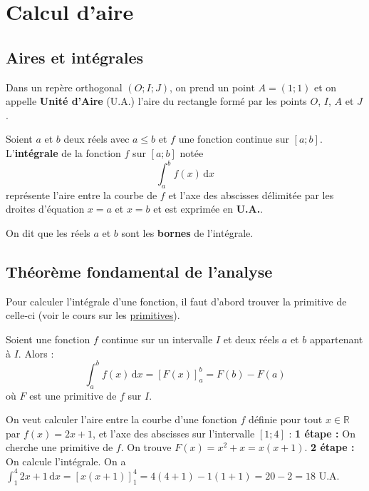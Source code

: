 


	
	\section{Calcul d'aire}
	
	\subsection{Aires et intégrales}
	
	Dans un repère orthogonal $(O; I; J)$, on prend un point $A = (1; 1)$ et on appelle \textbf{Unité d'Aire} (U.A.) l'aire du rectangle formé par les points $O$, $I$, $A$ et $J$.
	
	
	Soient $a$ et $b$ deux réels avec $a \leq b$ et $f$ une fonction continue sur $[a;b]$. L'\textbf{intégrale} de la fonction $f$ sur $[a;b]$ notée
	\[ \int_{a}^{b} f(x) \, \mathrm{d}x \]
	représente l'aire entre la courbe de $f$ et l'axe des abscisses délimitée par les droites d'équation $x = a$ et $x = b$
	et est exprimée en \textbf{U.A.}.
	
	
	On dit que les réels $a$ et $b$ sont les \textbf{bornes} de l'intégrale.
	
	\subsection{Théorème fondamental de l'analyse}
	
	Pour calculer l'intégrale d'une fonction, il faut d'abord trouver la primitive de celle-ci (voir le cours sur les \href{https://bacomathiqu.es/cours/terminale/primitives-equations-differentielles/}{primitives}).
	
	\begin{formula}
		Soient une fonction $f$ continue sur un intervalle $I$ et deux réels $a$ et $b$ appartenant à $I$. Alors :
		\[ \int_{a}^{b} f(x) \, \mathrm{d}x = \left[ F(x) \right]_a^b = F(b) - F(a) \]
		où $F$ est une primitive de $f$ sur $I$.
	\end{formula}
	
	\begin{tip}[Exemple]
		On veut calculer l'aire entre la courbe d'une fonction $f$ définie pour tout $x \in \mathbb{R}$ par $f(x) = 2x + 1$, et l'axe des abscisses sur l'intervalle $[1;4]$ :
		\newpar
		\textbf{1\iere{} étape :} On cherche une primitive de $f$. On trouve $F(x) = x^2 + x = x(x + 1)$.
		\newpar
		\textbf{2\ieme{} étape :} On calcule l'intégrale.
		On a $\int_{1}^{4} 2x + 1 \, \mathrm{d}x = \left[ x(x + 1) \right]_1^4 = 4(4 + 1) - 1(1 + 1) = 20 - 2 = 18$ U.A.
	\end{tip}
	
